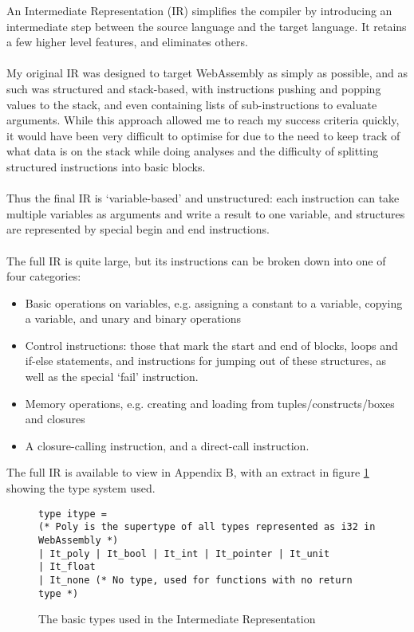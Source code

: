 An Intermediate Representation (IR) simplifies the compiler by introducing an intermediate step between the source language and the target language. It retains a few higher level features, and eliminates others.
\\\\
My original IR was designed to target WebAssembly as simply as possible, and as such was structured and stack-based, with instructions pushing and popping values to the stack, and even containing lists of sub-instructions to evaluate arguments. While this approach allowed me to reach my success criteria quickly, it would have been very difficult to optimise for due to the need to keep track of what data is on the stack while doing analyses and the difficulty of splitting structured instructions into basic blocks.
\\\\
Thus the final IR is `variable-based' and unstructured: each instruction can take multiple variables as arguments and write a result to one variable, and structures are represented by special begin and end instructions.
\\\\
The full IR is quite large, but its instructions can be broken down into one of four categories:
\begin{itemize}
\item Basic operations on variables, e.g. assigning a constant to a variable, copying a variable, and unary and binary operations
\item Control instructions: those that mark the start and end of blocks, loops and if-else statements, and instructions for jumping out of these structures, as well as the special `fail' instruction.
\item Memory operations, e.g. creating and loading from tuples/constructs/boxes and closures
\item A closure-calling instruction, and a direct-call instruction.
\end{itemize}
The full IR is available to view in Appendix B, with an extract in figure \ref{fig:ir} showing the type system used.
\begin{figure}[h]
\begin{verbatim}
type itype =
(* Poly is the supertype of all types represented as i32 in WebAssembly *)
| It_poly | It_bool | It_int | It_pointer | It_unit
| It_float
| It_none (* No type, used for functions with no return type *)
\end{verbatim}
\caption{The basic types used in the Intermediate Representation}
\label{fig:ir}
\end{figure}
